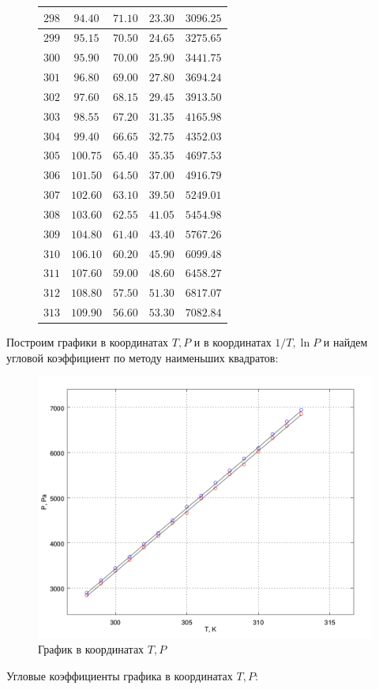 \documentclass[20pt]{article}
\begin{document}
\begin{figure}[H]
\begin{floatrow}
{\begin{tabular}{|c|c|c|c|c|}
					 \\\hline $298$ & $94.40$ & $71.10$ & $23.30$ & $3096.25$
					 \\\hline $299$ & $95.15$ & $70.50$ & $24.65$ & $3275.65$
					 \\\hline $300$ & $95.90$ & $70.00$ & $25.90$ & $3441.75$
					 \\\hline $301$ & $96.80$ & $69.00$ & $27.80$ & $3694.24$
					 \\\hline $302$ & $97.60$ & $68.15$ & $29.45$ & $3913.50$
					 \\\hline $303$ & $98.55$ & $67.20$ & $31.35$ & $4165.98$
					 \\\hline $304$ & $99.40$ & $66.65$ & $32.75$ & $4352.03$
					 \\\hline $305$ & $100.75$ & $65.40$ & $35.35$ & $4697.53$
					 \\\hline $306$ & $101.50$ & $64.50$ & $37.00$ & $4916.79$
					 \\\hline $307$ & $102.60$ & $63.10$ & $39.50$ & $5249.01$
					 \\\hline $308$ & $103.60$ & $62.55$ & $41.05$ & $5454.98$
					 \\\hline $309$ & $104.80$ & $61.40$ & $43.40$ & $5767.26$
					 \\\hline $310$ & $106.10$ & $60.20$ & $45.90$ & $6099.48$
					 \\\hline $311$ & $107.60$ & $59.00$ & $48.60$ & $6458.27$
					 \\\hline $312$ & $108.80$ & $57.50$ & $51.30$ & $6817.07$
					 \\\hline $313$ & $109.90$ & $56.60$	& $53.30$ & $7082.84$\\\hline
		\end{tabular}
		}
	\end{floatrow}
\end{figure}
Построим графики в координатах $T, P$ и в координатах $1/T, \ln P$ и найдем угловой коэффициент по методу наименьших квадратов:
\begin{figure}[H]
	\caption{График в координатах $T, P$}
	\center
	\includegraphics[scale=0.3]{PT.png}
\end{figure}
Угловые коэффициенты графика в координатах $T, P$:
\end{document}
